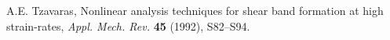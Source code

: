 \documentclass[a4paper,11pt]{article}
\theoremstyle{remark}
\begin{document}
{\begin{thebibliography}{10}

{\sc A.E. Tzavaras},
Nonlinear analysis techniques for shear band formation at high strain-rates,
{\it Appl. Mech. Rev.}
{\bf  45} (1992), S82--S94.



%
%


%
%
%
%

%
%
%
%
%
%
%
%


\end{thebibliography}}
\end{document}
